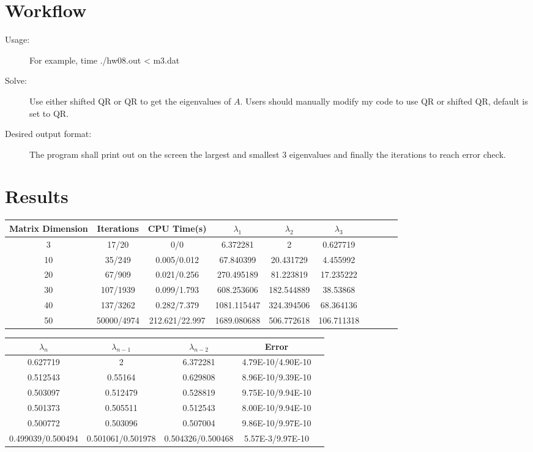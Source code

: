 \documentclass[12pt,a4paper]{article}
\begin{document}
\section{Workflow}

\begin{description}  

\item [Usage:] For example, time ./hw08.out < m3.dat
\item [Solve:] Use either shifted QR or QR to get the eigenvalues of $A$. Users should manually modify my code to use QR or shifted QR, default is set to QR.
\item[Desired output format:] The program shall print out on the screen the largest and smallest 3 eigenvalues and finally the iterations to reach error check.
\end{description}

\section{Results}

\begin{tabular}{|c|c|c|c|c|c|c|c|c|c|}
\hline  Matrix Dimension & Iterations\footnotemark[1] & CPU Time(s)\footnotemark[1]  & $\lambda_1$ & $\lambda_2$& $\lambda_3$  \\
\hline 3	&17/20	        &0/0	        		&6.372281	&2			&0.627719	\\
\hline 10	&35/249	        &0.005/0.012	&67.840399	&20.431729	&4.455992	\\
\hline 20	&67/909	        &0.021/0.256	&270.495189	&81.223819	&17.235222	\\
\hline 30	&107/1939	&0.099/1.793	&608.253606	&182.544889	&38.53868	\\
\hline 40	&137/3262	&0.282/7.379	&1081.115447	&324.394506	&68.364136	\\
\hline 50	&50000/4974	&212.621/22.997 &1689.080688	&506.772618	&106.711318	\\\hline

\end{tabular}
\begin{tabular}{|c|c|c|c|c|}
\hline   $\lambda_n$ & $\lambda_{n-1}$ & $\lambda_{n-2}$& Error\footnotemark[1]  \\
\hline 0.627719	&2			&6.372281	&4.79E-10/4.90E-10\\
\hline 0.512543	&0.55164		&0.629808	&8.96E-10/9.39E-10\\
\hline 0.503097	&0.512479	&0.528819	&9.75E-10/9.94E-10\\
\hline 0.501373	&0.505511	&0.512543	&8.00E-10/9.94E-10\\
\hline 0.500772	&0.503096	&0.507004	&9.86E-10/9.97E-10\\
\hline 0.499039/0.500494\footnotemark[1] 	&0.501061/0.501978	\footnotemark[1] &0.504326/0.500468	\footnotemark[1] &5.57E-3/9.97E-10\\\hline

\end{tabular}
\newpage
\end{document}
